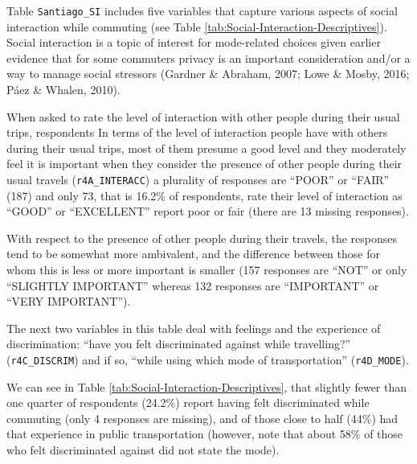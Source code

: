 \documentclass[
11pt, %
oneside, %
english, %
singlespacing, %
]{macthesis} %
\begin{document}
Table \texttt{Santiago\_SI} includes five variables that capture various aspects of social interaction while commuting (see Table \ref{tab:Social-Interaction-Descriptives}). Social interaction is a topic of interest for mode-related choices given earlier evidence that for some commuters privacy is an important consideration and/or a way to manage social stressors (Gardner \& Abraham, 2007; Lowe \& Mosby, 2016; Páez \& Whalen, 2010).

When asked to rate the level of interaction with other people during their usual trips, respondents In terms of the level of interaction people have with others during their usual trips, most of them presume a good level and they moderately feel it is important when they consider the presence of other people during their usual travels (\texttt{r4A\_INTERACC}) a plurality of responses are ``POOR'' or ``FAIR'' (187) and only 73, that is 16.2\% of respondents, rate their level of interaction as ``GOOD'' or ``EXCELLENT'' report poor or fair (there are 13 missing responses).

With respect to the presence of other people during their travels, the responses tend to be somewhat more ambivalent, and the difference between those for whom this is less or more important is smaller (157 responses are ``NOT'' or only ``SLIGHTLY IMPORTANT'' whereas 132 responses are ``IMPORTANT'' or ``VERY IMPORTANT'').

The next two variables in this table deal with feelings and the experience of discrimination: ``have you felt discriminated against while travelling?'' (\texttt{r4C\_DISCRIM}) and if so, ``while using which mode of transportation'' (\texttt{r4D\_MODE}).

We can see in Table \ref{tab:Social-Interaction-Descriptives}, that slightly fewer than one quarter of respondents (24.2\%) report having felt discriminated while commuting (only 4 responses are missing), and of those close to half (44\%) had that experience in public transportation (however, note that about 58\% of those who felt discriminated against did not state the mode).
\end{document}
